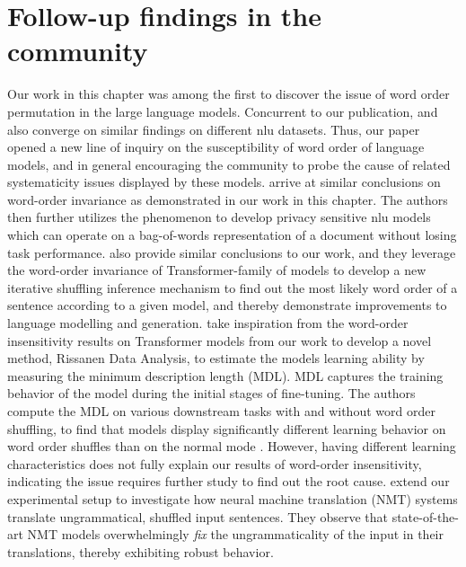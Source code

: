 \documentclass[letterpaper, 12pt]{report}
\begin{document}
\section{Follow-up findings in the community}
\label{sec:unli_followup}

Our work in this chapter was among the first to discover the issue of word order permutation in the large language models. Concurrent to our publication, \citet{gupta-etal-2021-bert} and \citet{pham-etal-2020-out} also converge on similar findings on different \acrshort{nlu} datasets. Thus, our paper opened a new line of inquiry on the susceptibility of word order of language models, and in general encouraging the community to probe the cause of related systematicity issues displayed by these models.
\citet{hessel-schofield-2021-effective} arrive at similar conclusions on word-order invariance as demonstrated in our work in this chapter. The authors then further utilizes the phenomenon to develop privacy sensitive \acrshort{nlu} models which can operate on a bag-of-words representation of a document without losing task performance.
\citet{Malkin2021StudyingWO} also provide similar conclusions to our work, and they leverage the word-order invariance of Transformer-family of models to develop a new iterative shuffling inference mechanism to find out the most likely word order of a sentence according to a given model, and thereby demonstrate improvements to language modelling and generation.
\citet{Perez2021RissanenDA} take inspiration from the word-order insensitivity results on Transformer models from our work to develop a novel method, Rissanen Data Analysis, to estimate the models learning ability by measuring the minimum description length (MDL). MDL captures the training behavior of the model during the initial stages of fine-tuning. The authors compute the MDL on various downstream tasks with and without word order shuffling, to find that models display significantly different learning behavior on word order shuffles than on the normal mode \citep[Section 4.3.4, pp. 8.][]{Perez2021RissanenDA}. However, having different learning characteristics does not fully explain our results of word-order insensitivity, indicating the issue requires further study to find out the root cause.
\citet{parthasarathi-etal-2021-sometimes-want} extend our experimental setup to investigate how neural machine translation (NMT) systems translate ungrammatical, shuffled input sentences. They observe that state-of-the-art NMT models overwhelmingly \textit{fix} the ungrammaticality of the input in their translations, thereby exhibiting robust behavior.
\end{document}
